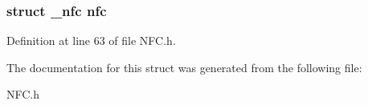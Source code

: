 \hypertarget{structNFCExtends_acf0441e1462c7b5253838f663761996a}{
\subsubsection[{nfc}]{\setlength{\rightskip}{0pt plus 5cm}struct {\bf \-\_\-nfc} nfc}}\label{structNFCExtends_acf0441e1462c7b5253838f663761996a}


Definition at line 63 of file N\-F\-C.\-h.



The documentation for this struct was generated from the following file\-:\begin{DoxyCompactItemize}
\item 
N\-F\-C.\-h\end{DoxyCompactItemize}
